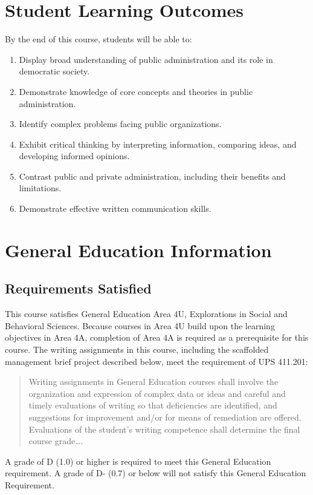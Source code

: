 \documentclass[12pt]{article}
\begin{document}
\section*{Student Learning Outcomes}

{\setlength{\parindent}{0pt}\setlength{\parskip}{0.6\baselineskip}%
By the end of this course, students will be able to:

\begin{enumerate}
    \item Display broad understanding of public administration and its role in democratic society.
    \item Demonstrate knowledge of core concepts and theories in public administration.
    \item Identify complex problems facing public organizations.
    \item Exhibit critical thinking by interpreting information, comparing ideas, and developing informed opinions.
    \item Contrast public and private administration, including their benefits and limitations.
    \item Demonstrate effective written communication skills.
\end{enumerate}
}

\section*{General Education Information}

\subsection*{Requirements Satisfied}
This course satisfies General Education Area 4U, Explorations in Social and Behavioral Sciences. Because courses in Area 4U build upon the learning objectives in Area 4A, completion of Area 4A is required as a prerequisite for this course. The writing assignments in this course, including the scaffolded management brief project described below, meet the requirement of UPS 411.201:
\begin{quote}Writing assignments in General Education courses shall involve the organization and expression of complex data or ideas and careful and timely evaluations of writing so that deficiencies are identified, and suggestions for improvement and/or for means of remediation are offered. Evaluations of the student's writing competence shall determine the final course grade\ldots .\end{quote}
A grade of D (1.0) or higher is required to meet this General Education requirement. A grade of D- (0.7) or below will not satisfy this General Education Requirement.
\end{document}
